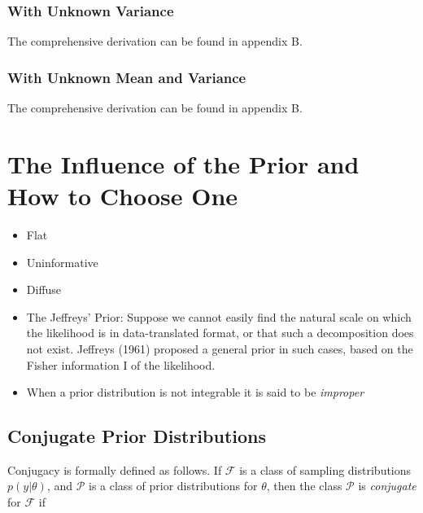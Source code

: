 \subsubsection{With Unknown Variance}

The comprehensive derivation can be found in appendix B. 

\subsubsection{With Unknown Mean and Variance}

The comprehensive derivation can be found in appendix B. 




\section{The Influence of the Prior and How to Choose One}\label{sec:prior}

\begin{itemize}
    \item Flat
    \item Uninformative
    \item Diffuse
    \item The Jeffreys’ Prior: Suppose we cannot easily find the natural scale on which the likelihood is in data-translated format, or that such a decomposition does not exist. Jeffreys (1961) proposed a general prior in such cases, based on the Fisher information I of the likelihood. 
    \item When a prior distribution is not integrable it is said to be \textit{improper}
\end{itemize}


\subsection{Conjugate Prior Distributions}

Conjugacy is formally defined as follows. If $\mathcal{F}$ is a class of sampling distributions $p \left(y | \theta \right)$, and $\mathcal{P}$ is a class of prior distributions for $\theta$, then the class $\mathcal{P}$ is \textit{conjugate} for $\mathcal{F}$ if

